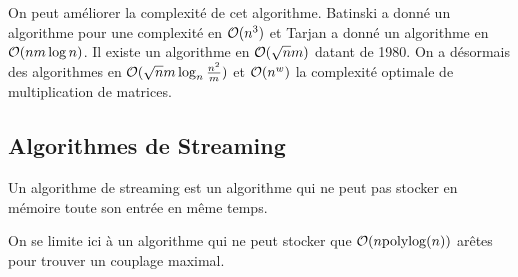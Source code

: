 \documentclass[math, info]{cours}
\begin{document}
On peut améliorer la complexité de cet algorithme.
Batinski a donné un algorithme pour une complexité en $\mathcal{O}(n^{3})$ et Tarjan a donné un algorithme en $\mathcal{O}(nm\log n)$.
Il existe un algorithme en $\mathcal{O}(\sqrt{n} m)$ datant de 1980.
On a désormais des algorithmes en $\mathcal{O}(\sqrt{n}m\log_{n}\frac{n^{2}}{m})$ et $\mathcal{O}(n^{w})$ la complexité optimale de multiplication de matrices.

\subsection{Algorithmes de Streaming}
\begin{definition}
	Un algorithme de streaming est un algorithme qui ne peut pas stocker en mémoire toute son entrée en même temps.
	\label{def:streamingalgorithm}
\end{definition}

On se limite ici à un algorithme qui ne peut stocker que $\mathcal{O}(n\mathrm{polylog}(n))$ arêtes pour trouver un couplage maximal.
\end{document}
